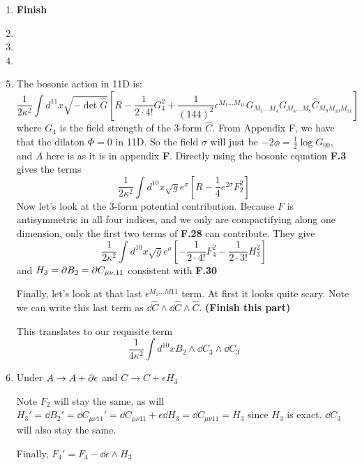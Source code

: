 \documentclass[11pt, class=article, crop=false]{standalone}
\begin{document}
\begin{enumerate}
	\item \textbf{Finish}
	
	\item 
	
	\item 
	
	\item 
	
	\item The bosonic action in 11D is:
	\[
		\frac{1}{2\kappa^2} \int d^{11} x \sqrt{-\det \hat G} \left[R - \frac{1}{2 \cdot 4!} G_4^2 + \frac{1}{(144)^2} \epsilon^{M_1 \dots M_{11}} G_{M_1 \dots M_4} G_{M_4 \dots M_8} \hat C_{M_9 M_{10} M_{11}}\right]
	\]
	where $G_4$ is the field strength of the 3-form $\hat C$. From Appendix F, we have that the dilaton $\Phi = 0$ in 11D. So the field $\sigma$ will just be $-2\phi = \frac12 \log G_{00}$, and $A$ here is as it is in appendix \textbf{F}. Directly using the bosonic equation \textbf{F.3} gives the terms
	\[
		\frac{1}{2\kappa^2 }\int d^10 x \sqrt g e^{\sigma} \left[R - \frac14 e^{2\sigma} F_2^2  \right]
	\]
	Now let's look at the $3$-form potential contribution. Because $F$ is antisymmetric in all four indices, and we only are compactifying along one dimension, only the first two terms of \textbf{F.28} can contribute. They give
	\[
		\frac{1}{2\kappa^2} \int d^{10} x \sqrt{g} e^\sigma \left[-\frac{1}{2 \cdot 4!} F_4^2 - \frac{1}{2 \cdot 3!} H_3^2 \right]
	\]
	and $H_3 = \partial B_2 = \partial C_{\mu \nu, 11}$ consistent with \textbf{F.30}

	Finally, let's look at that last $\epsilon^{M_1 \dots M{11}}$ term. At first it looks quite scary. Note we can write this last term as $\dd \hat C \wedge \dd \hat C \wedge \hat C$. \textbf{(Finish this part)}
	
	This translates to our requisite term
	\[
		\frac{1}{4\kappa^2} \int d^{10} x B_2 \wedge \dd C_3 \wedge \dd C_3
	\]
	\item Under $A \to A + \partial \epsilon$ and $C \to C + \epsilon H_3$
	
	Note $F_2$ will stay the same, as will $H_3' = \dd B_2' = \dd C_{\mu \nu 11}' = \dd C_{\mu \nu 11} + \epsilon \dd H_3 = \dd C_{\mu \nu 11} = H_3$ since $H_3$ is exact. $\dd C_3$ will also stay the same. 
	
	Finally, $F_4' = F_4 - \dd \epsilon \wedge H_3$
	

\end{enumerate}
	
\end{document}
